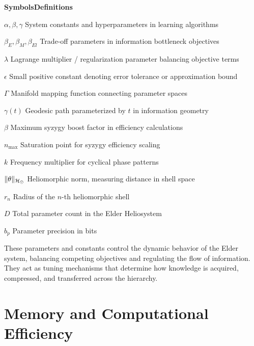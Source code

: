 \begin{multicols}{2}
\noindent\textbf{\large Symbols}\hfill\textbf{\large Definitions}

\vspace{0.3cm}
\noindent$\alpha, \beta, \gamma$ \dotfill System constants and hyperparameters in learning algorithms

\noindent$\beta_E, \beta_M, \beta_{El}$ \dotfill Trade-off parameters in information bottleneck objectives

\noindent$\lambda$ \dotfill Lagrange multiplier / regularization parameter balancing objective terms

\noindent$\epsilon$ \dotfill Small positive constant denoting error tolerance or approximation bound

\noindent$\Gamma$ \dotfill Manifold mapping function connecting parameter spaces

\noindent$\gamma(t)$ \dotfill Geodesic path parameterized by $t$ in information geometry

\noindent$\beta$ \dotfill Maximum syzygy boost factor in efficiency calculations

\noindent$n_{\text{max}}$ \dotfill Saturation point for syzygy efficiency scaling

\noindent$k$ \dotfill Frequency multiplier for cyclical phase patterns

\noindent$\|\theta\|_{\mathcal{H}_{\odot}}$ \dotfill Heliomorphic norm, measuring distance in shell space

\noindent$r_n$ \dotfill Radius of the $n$-th heliomorphic shell

\noindent$D$ \dotfill Total parameter count in the Elder Heliosystem

\noindent$b_p$ \dotfill Parameter precision in bits
\end{multicols}

\vspace{1cm}
\begin{center}
These parameters and constants control the dynamic behavior of the Elder system, balancing competing objectives and regulating the flow of information. They act as tuning mechanisms that determine how knowledge is acquired, compressed, and transferred across the hierarchy.
\end{center}

\clearpage
\chapter*{Memory and Computational Efficiency}

